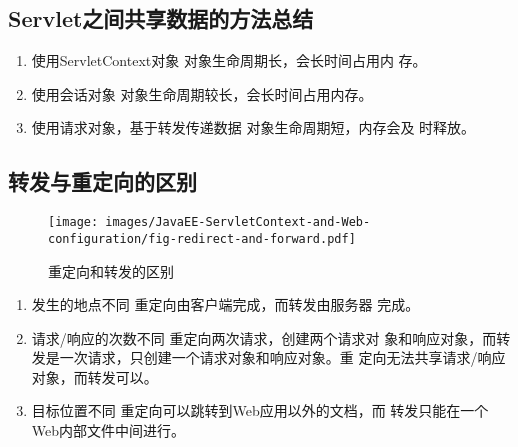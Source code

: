 
\subsection{Servlet之间共享数据的方法总结} 

\begin{enumerate}
\item {\hei 使用ServletContext对象} 对象生命周期长，会长时间占用内
  存。
\item {\hei 使用会话对象} 对象生命周期较长，会长时间占用内存。
\item {\hei 使用请求对象，基于转发传递数据} 对象生命周期短，内存会及
  时释放。
\end{enumerate}

\subsection{转发与重定向的区别} 

\begin{figure}[htb]
\centering
\texttt{[image: images/JavaEE-ServletContext-and-Web-configuration/fig-redirect-and-forward.pdf]}
\caption{重定向和转发的区别}
\label{fig:redirect-and-forword}
\end{figure}


\begin{enumerate}
\item {\hei 发生的地点不同} {\kai 重定向由客户端完成，而转发由服务器
    完成。}
\item {\hei 请求/响应的次数不同} {\kai 重定向两次请求，创建两个请求对
    象和响应对象，而转发是一次请求，只创建一个请求对象和响应对象。重
    定向无法共享请求/响应对象，而转发可以。}
\item {\hei 目标位置不同} {\kai 重定向可以跳转到Web应用以外的文档，而
    转发只能在一个Web内部文件中间进行。}
\end{enumerate}

